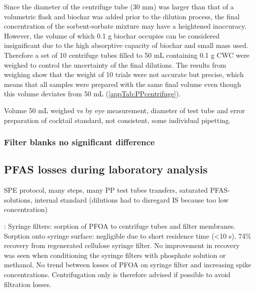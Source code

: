 Since the diameter of the centrifuge tube (30 mm) was larger than that of a volumetric flask and biochar was added prior to the dilution process, the final concentration of the sorbent-sorbate mixture may have a heightened inaccuracy. However, the volume of which 0.1 g biochar occupies can be considered insignificant due to the high absorptive capacity of biochar and small mass used. Therefore a set of 10 centrifuge tubes filled to 50 mL containing 0.1 g CWC were weighed to control the uncertainty of the final dilutions. The results from weighing show that the weight of 10 trials were not accurate but precise, which means that all samples were prepared with the same final volume even though this volume deviates from 50 mL (\cref{appTab:PPcentrifuge}). 

Volume 50 mL weighed vs by eye measurement, diameter of test tube and error
preparation of cocktail standard, not consistent, some individual pipetting. 

\subsubsection{Filter blanks no significant difference}

\subsection{PFAS losses during laboratory analysis}
SPE protocol, many steps, many PP test tubes transfers, saturated PFAS-solutions, internal standard (dilutions had to disregard IS because too low concentration)

\citep{Lath2019labsorb}: 
Syringe filters: sorption of PFOA to centrifuge tubes and filter membranes. Sorption onto syringe surface: negligible due to short residence time (\textless 10 s). 74\% recovery from regenerated cellulose syringe filter. No improvement in recovery was seen when conditioning the syringe filters with phosphate solution or methanol. No trend between losses of PFOA on syringe filter and increasing spike concentrations. Centrifugation only is therefore advised if possible to avoid filtration losses. 

